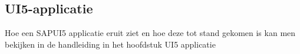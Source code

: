 %        
%            
%            
%            
%        
%            
%            
%            
            
        \subsection{UI5-applicatie}
        Hoe een SAPUI5 applicatie eruit ziet en hoe deze tot stand gekomen is kan men bekijken in de handleiding in het hoofdstuk UI5 applicatie